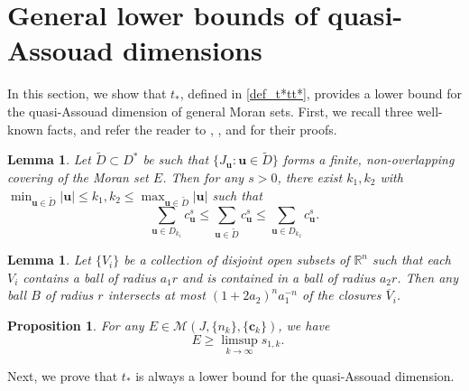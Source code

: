 \documentclass[12pt]{amsart}
\numberwithin{equation}{section}
\theoremstyle{plain}
\newtheorem{proposition}[theorem]{Proposition}
\newtheorem{lemma}[theorem]{Lemma}
\theoremstyle{remark}
\theoremstyle{definition}
\newcommand{\R}{\mathbb{R}}
\newcommand{\bu}{\mathbf{u}}
\newcommand{\ccc}{\mathbf{c}}
\renewcommand{\ge}{\geqslant}
\renewcommand{\leq}{\leqslant}
\DeclareMathOperator{\odimb}{\overline{dim}_B}
\begin{document}
	\section{General lower bounds of quasi-Assouad dimensions}\label{sec_glb}
	 In this section, we show that $t_*$, defined in \eqref{def_t*tt*}, provides a lower bound for the quasi-Assouad dimension of general Moran sets.  First, we recall three well-known facts, and refer the reader to \cite{CM, Wen2000}, \cite[Lemma 9.2]{falconer2013fractal}, and \cite[Proposition 2.2]{hua2000structures} for their proofs.
	\begin{lemma}\label{compensate}
	Let $\tilde{D}\subset D^*$ be such that $\{J_{\bu}:\bu\in\tilde{D}\}$ forms a finite, non-overlapping covering of the Moran set $E$. Then for any $s>0$, there exist $k_1,k_2$ with $\min_{\bu\in\tilde{D}}|\bu|\leq k_1,k_2\leq \max_{\bu\in\tilde{D}}|\bu|$ such that
		\[
		\sum_{\bu\in{D}_{k_1}}c^{s}_{\bu}\leq\sum_{\bu\in\tilde{D}}c^{s}_{\bu}\leq\sum_{\bu\in{D}_{k_2}}c^{s}_{\bu}.
		\]
	\end{lemma}
	
\begin{lemma}\label{numberofball}
	Let $\{V_i\}$ be a collection of disjoint open subsets of $\R^n$ such that each $V_i$ contains a
	ball of radius $a_1r$ and is contained in a ball of radius $a_2r$. Then any ball $B$ of radius
	$r$ intersects at most $(1+2a_2)^na_1^{-n}$ of the closures $\overline{V}_i$.
\end{lemma}

\begin{proposition}\label{lowerboundofbox}
	For any $E\in \mathcal{M}(J,\{n_k\},\{\ccc_k\})$, we have
	\[
	\odimb E\ge \limsup_{k\to\infty} s_{1,k}.
	\]
\end{proposition}

	Next, we prove that  $t_*$ is always a lower bound for the quasi-Assouad dimension.
	
\end{document}
